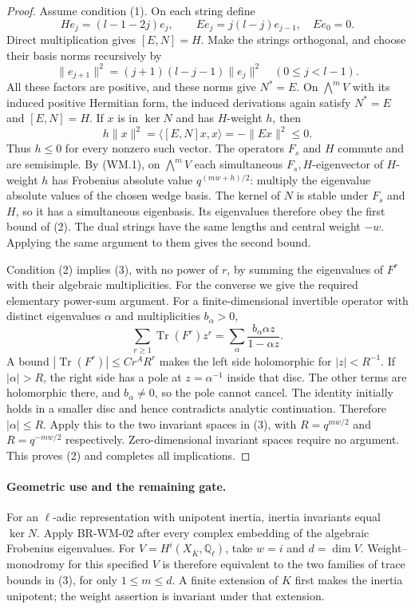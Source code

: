 \begin{proof}
Assume condition (1). On each string define
\[
 H e_j=(l-1-2j)e_j,\qquad
 E e_j=j(l-j)e_{j-1},\quad E e_0=0.
\]
Direct multiplication gives $[E,N]=H$.
Make the strings orthogonal, and choose their basis norms
recursively by
\[
 \|e_{j+1}\|^2=(j+1)(l-j-1)\|e_j\|^2
       \quad(0\leq j<l-1).
\]
All these factors are positive, and these norms give
$N^*=E$. On $\bigwedge^mV$ with its induced positive
Hermitian form, the induced derivations again satisfy
$N^*=E$ and $[E,N]=H$.
If $x$ is in $\ker N$ and has $H$-weight $h$, then
\[
 h\|x\|^2=\langle [E,N]x,x\rangle=-\|Ex\|^2\leq0.
\]
Thus $h\leq0$ for every nonzero such vector.
The operators $F_s$ and $H$ commute and are semisimple.
By (WM.1), on $\bigwedge^mV$ each simultaneous
$F_s,H$-eigenvector of $H$-weight $h$ has Frobenius
absolute value $q^{(mw+h)/2}$: multiply the eigenvalue
absolute values of the chosen wedge basis.
The kernel of $N$ is stable under $F_s$ and $H$, so it
has a simultaneous eigenbasis. Its eigenvalues therefore
obey the first bound of (2). The dual strings have the
same lengths and central weight $-w$. Applying the
same argument to them gives the second bound.

Condition (2) implies (3), with no power of $r$,
by summing the eigenvalues of $F^r$ with their
algebraic multiplicities. For the converse we give
the required elementary power-sum argument. For a
finite-dimensional invertible operator with distinct
eigenvalues $\alpha$ and multiplicities $b_\alpha>0$,
\[
 \sum_{r\geq1}\operatorname{Tr}(F^r)z^r
       =\sum_\alpha\frac{b_\alpha\alpha z}{1-\alpha z}.
\]
A bound $|\operatorname{Tr}(F^r)|\leq Cr^AR^r$
makes the left side holomorphic for $|z|<R^{-1}$.
If $|\alpha|>R$, the right side has a pole at
$z=\alpha^{-1}$ inside that disc. The other terms
are holomorphic there, and $b_\alpha\ne0$, so the
pole cannot cancel. The identity initially holds
in a smaller disc and hence contradicts analytic
continuation. Therefore $|\alpha|\leq R$.
Apply this to the two invariant spaces in (3),
with $R=q^{mw/2}$ and $R=q^{-mw/2}$ respectively.
Zero-dimensional invariant spaces require no argument.
This proves (2) and completes all implications.
\end{proof}

\paragraph{Geometric use and the remaining gate.}
For an $\ell$-adic representation with unipotent inertia,
inertia invariants equal $\ker N$. Apply BR-WM-02
after every complex embedding of the algebraic Frobenius
eigenvalues. For $V=H^i(X_{\overline K},\mathbb Q_\ell)$,
take $w=i$ and $d=\dim V$. Weight--monodromy for this
specified $V$ is therefore equivalent to the two
families of trace bounds in (3), for only
$1\leq m\leq d$. A finite extension of $K$ first
makes the inertia unipotent; the weight assertion
is invariant under that extension.

